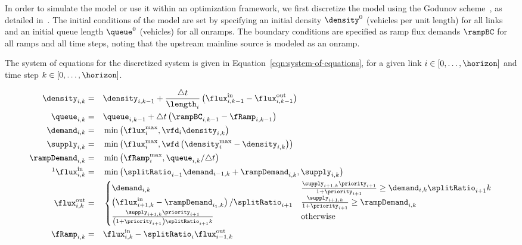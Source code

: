 In order to simulate the model or use it within an optimization framework, we first discretize the model using the Godunov scheme~\cite{godunov1959}, as detailed in~\cite{Monache2013}. The initial conditions of the model are set by specifying an initial density $\po$ (vehicles per unit length) for all links and an initial queue length $\lo$ (vehicles) for all onramps. The boundary conditions are specified as ramp flux demands $\rampBC$ for all ramps and all time steps, noting that the upstream mainline source is modeled as an onramp.

The system of equations for the discretized system is given in Equation~\eqref{eqn:system-of-equations}, for a given link $i \in \left[0,\ldots,\horizon\right]$ and time step $k \in \left[0,\ldots,\horizon\right]$.

\begin{equation}
\begin{aligned}
\label{eqn:system-of-equations}
\idx{\density}{i}{k} & = & &
\idx{\density}{i}{k-1} + \frac{\dt}{\length_i} \left(\idx{\fIn}{i}{k-1} - \idx{\fOut}{i}{k-1}\right)
\\
\idx{\queue}{i}{k} & = & &
\idx{\queue}{i}{k-1} + \dt \left(\idx{\rampBC}{i}{k-1} - \idx{\fRamp}{i}{k-1}\right) \\
\idx{\demand}{i}{k} & = & &
\min\left( \fmfd_i, \vfd_i \idx{\density}{i}{k} \right)
\\
\idx{\supply}{i}{k} & = & &
\min\left(\fmfd_i, \wfd \left( \pmfd_i - \idx{\density}{i}{k} \right)\right)
\\
\idx{\rampDemand}{i}{k} & = & &
\min\left( \rampMax_i, \idx{\queue}{i}{k} / \dt \right)
\\
\footnotemark
\idx{\fIn}{i}{k} & = & &
\min\left( \splitRatio_{i-1} \idx{\demand}{i-1}{k} + \idx{\rampDemand}{i}{k}, \idx{\supply}{i}{k} \right)
\\
\idx{\fOut}{i}{k} & = & &
\begin{cases}
\idx{\demand}{i}{k} &
\frac{\idx{\supply}{i+1}{k}\priority_{i+1}}{1 + \priority_{i+1}} \ge \idx{\demand}{i}{k}\splitRatio_{i+1}{k} \\
\left(\idx{\fIn}{i+1}{k} - \idx{\rampDemand}{i_1}{k}\right) / \splitRatio_{i +1} & 
\frac{\idx{\supply}{i+1}{k}}{1 + \priority_{i+1}} \ge \idx{\rampDemand}{i}{k} \\
\frac{\idx{\supply}{i+1}{k}\priority_{i+1}}{\left(1 + \priority_{i+1}\right)\splitRatio_{i+1}{k}} &
\text{otherwise}
\end{cases}
\\
\idx{\fRamp}{i}{k} & = & &
\idx{\fIn}{i}{k} - \splitRatio_{i} \idx{\fOut}{i-1}{k}
\end{aligned}
\end{equation}

